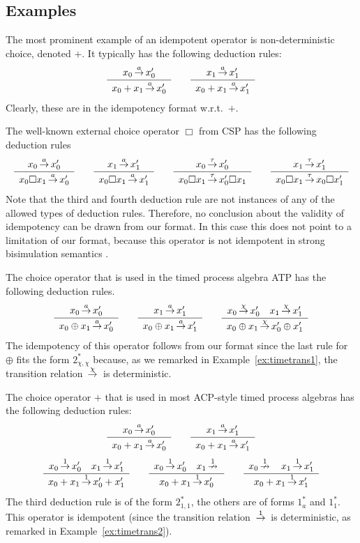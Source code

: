 \subsection{Examples} %

\begin{example}
The most prominent example of an idempotent operator is non-deterministic choice, denoted $+$. It typically has the following deduction rules:
\[
\sosrule{x_0 \trans{a} x_0'}{x_0 + x_1 \trans{a} x_0'} \qquad
\sosrule{x_1 \trans{a} x_1'}{x_0 + x_1 \trans{a} x_1'}
\]
Clearly, these are in the idempotency format w.r.t.\ $+$.
\end{example}

\begin{example}
The well-known external choice operator $\Box$ from CSP \cite{Hoare85} has the following deduction rules
\[
\sosrule{x_0 \trans{a} x'_0}{x_0 \Box x_1 \trans{a} x'_0}
\qquad
\sosrule{x_1 \trans{a} x'_1}{x_0 \Box x_1 \trans{a} x'_1}
\qquad
\sosrule{x_0 \trans{\tau} x'_0}{x_0 \Box x_1 \trans{\tau} x'_0 \Box x_1}
\qquad
\sosrule{x_1 \trans{\tau} x'_1}{x_0 \Box x_1 \trans{\tau} x_0 \Box x'_1}
\]
Note that the third and fourth deduction rule are not instances of any of the allowed types of deduction rules.
Therefore, no conclusion about the validity of idempotency can be drawn from our format.
In this case this does not point to a limitation of our format,
because this operator is not idempotent in strong bisimulation semantics \cite{dArgenio95}.
\end{example}

\begin{example}
The choice operator that is used in the timed process algebra ATP \cite{Nicollin94} has the following deduction rules.
\[
\sosrule{x_0 \trans{a} x'_0}{x_0 \oplus x_1 \trans{a} x'_0}
\qquad
\sosrule{x_1 \trans{a} x'_1}{x_0 \oplus x_1 \trans{a} x'_1}
\qquad
\sosrule{x_0 \trans{\chi} x'_0 \quad x_1 \trans{\chi} x'_1}{x_0 \oplus x_1 \trans{\chi} x'_0 \oplus x'_1}
\]
The idempotency of this operator follows from our format since the last rule for $\oplus$ fits
the form $2_{\chi,\chi}^*$ because, as we remarked in Example~\ref{ex:timetrans1}, the transition relation
$\,{\stackrel{{\chi}}{\rightarrow}}\,$ is deterministic.
\end{example}

\begin{example}
The choice operator $+$ that is used in most ACP-style timed process algebras has the following deduction rules:
\[
\sosrule{x_0 \trans{a} x_0'}{x_0 + x_1 \trans{a} x_0'} \qquad
\sosrule{x_1 \trans{a} x_1'}{x_0 + x_1 \trans{a} x_1'}\]
\[\sosrule{x_0 \trans{1} x'_0 \quad x_1 \trans{1} x'_1}{x_0 + x_1 \trans{1} x'_0 + x'_1} \qquad
\sosrule{x_0 \trans{1} x'_0 \quad x_1 \ntrans{1}}{x_0 + x_1 \trans{1} x'_0} \qquad
\sosrule{x_0 \ntrans{1}  \quad x_1 \trans{1} x'_1}{x_0 + x_1 \trans{1} x'_1}
\]
The third deduction rule is of the form $2^*_{1,1}$, the others are of forms $1^*_a$ and $1^*_1$.
This operator is idempotent (since the transition relation $\,{\stackrel{{1}}{\rightarrow}}\,$ is deterministic, as remarked
in Example~\ref{ex:timetrans2}).
\end{example}

